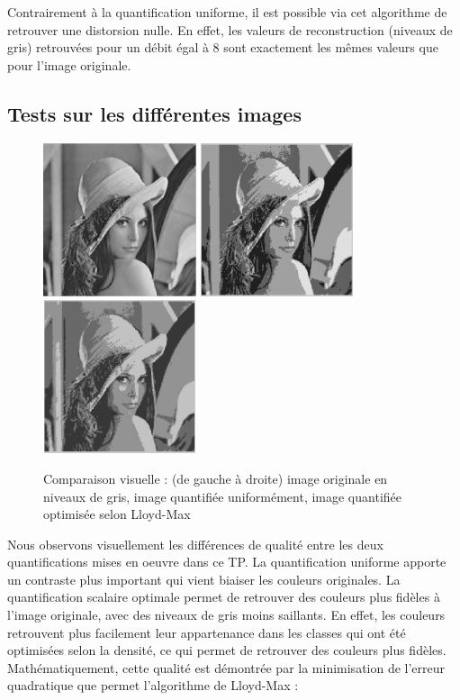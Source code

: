 \documentclass[a4paper, 12pt]{article}
\begin{document}
Contrairement à la quantification uniforme, il est possible via cet algorithme de retrouver une distorsion nulle. En effet, les valeurs de reconstruction (niveaux de gris) retrouvées pour un débit égal à 8 sont exactement les mêmes valeurs que pour l'image originale.

\subsection{Tests sur les différentes images}


\begin{figure}[H]
	\centering
		\includegraphics[width=4.5cm, height=4.5cm]{../lena_grey.jpg}
		\includegraphics[width=4.5cm, height=4.5cm]{../lena_quant_4_niveaux.jpg}
		\includegraphics[width=4.5cm, height=4.5cm]{../lena_quantlloyd_4_niveaux.jpg}
	\caption{Comparaison visuelle : (de gauche à droite) image originale en niveaux de gris, image quantifiée uniformément, image quantifiée optimisée selon Lloyd-Max}
	\label{fig:lena_quant_4_niveaux}
\end{figure}

Nous observons visuellement les différences de qualité entre les deux quantifications mises en oeuvre dans ce TP. La quantification uniforme apporte un contraste plus important qui vient biaiser les couleurs originales. La quantification scalaire optimale permet de retrouver des couleurs plus fidèles à l'image originale, avec des niveaux de gris moins saillants. En effet, les couleurs retrouvent plus facilement leur appartenance dans les classes qui ont été optimisées selon la densité, ce qui permet de retrouver des couleurs plus fidèles. Mathématiquement, cette qualité est démontrée par la minimisation de l'erreur quadratique que permet l'algorithme de Lloyd-Max :
\end{document}
